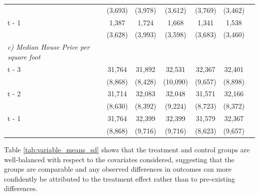 \begin{longtable}{p{4cm}cccccc}
          & (3,693) & (3,978) & (3,612) & (3,769) & (3,462) \\
    t - 1 & 1,387 & 1,724 & 1,668 & 1,341 & 1,538 \\
          & (3,628) & (3,993) & (3,598) & (3,683) & (3,460) \\
    \textit{c) Median House Price per square foot} & & & & & \\
    t - 3 & 31,764 & 31,892 & 32,531 & 32,367 & 32,401 \\
          & (8,868) & (8,428) & (10,090) & (9,657) & (8,898) \\
    t - 2 & 31,714 & 32,083 & 32,048 & 31,571 & 32,166 \\
          & (8,630) & (8,392) & (9,224) & (8,723) & (8,372) \\
    t - 1 & 31,764 & 32,399 & 32,399 & 31,579 & 32,367 \\
          & (8,868) & (9,716) & (9,716) & (8,623) & (9,657) \\
\end{longtable}



Table \ref{tab:variable_means_sd} shows that the treatment and control groups are well-balanced with respect to the covariates considered, suggesting that the groups are comparable and any observed differences in outcomes can more confidently be attributed to the treatment effect rather than to pre-existing differences.

